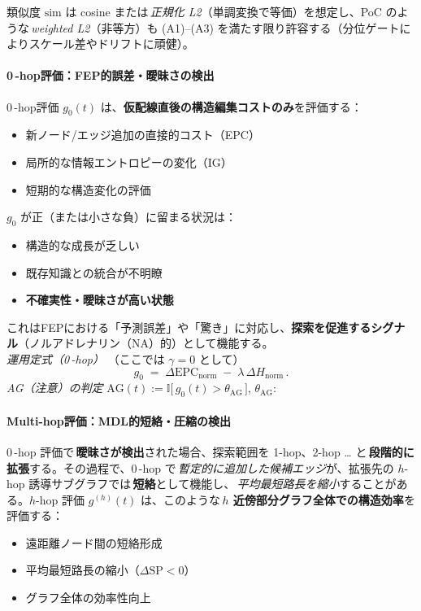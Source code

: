 \documentclass[ja=standard,xelatex]{bxjsarticle}
\begin{document}
\noindent 類似度 $\mathrm{sim}$ は cosine または\,\emph{正規化 L2}（単調変換で等価）を想定し、PoC のような\,\emph{weighted L2}（非等方）も (A1)–(A3) を満たす限り許容する（分位ゲートによりスケール差やドリフトに頑健）。


\paragraph{0\,\mbox{-}hop評価：FEP的誤差・曖昧さの検出}
0\,\mbox{-}hop評価 $g_0(t)$ は、\textbf{仮配線直後の構造編集コストのみ}を評価する：
\begin{itemize}
  \item 新ノード/エッジ追加の直接的コスト（EPC）
  \item 局所的な情報エントロピーの変化（IG）
  \item 短期的な構造変化の評価
\end{itemize}

$g_0$ が正（または小さな負）に留まる状況は：
\begin{itemize}
  \item 構造的な成長が乏しい
  \item 既存知識との統合が不明瞭
  \item \textbf{不確実性・曖昧さが高い状態}
\end{itemize}

これはFEPにおける「予測誤差」や「驚き」に対応し、\textbf{探索を促進するシグナル}（ノルアドレナリン（NA）的）として機能する。
\\[0.2em]
\textit{運用定式（0\,\mbox{-}hop）}\; （ここでは $\gamma{=}0$ として）
\begin{equation}
  g_0\;=\;\Delta\mathrm{EPC}_{\mathrm{norm}}\; -\; \lambda\,\Delta H_{\mathrm{norm}}\,.
  \label{eq:g0_runtime_b}
\end{equation}
\noindent \textit{AG（注意）の判定}\; \quad $\mathrm{AG}(t) := \mathbb{I}\big[\, g_0(t) > \theta_{\mathrm{AG}}\,\big]$, \;\; $\theta_{\mathrm{AG}}$:\,

\paragraph{Multi-hop評価：MDL的短絡・圧縮の検出}
0\,\mbox{-}hop 評価で\,\textbf{曖昧さが検出}された場合、探索範囲を 1-hop、2-hop … と\,\textbf{段階的に拡張}する。その過程で、0\,\mbox{-}hop で\,\emph{暫定的に追加した候補エッジ}が、拡張先の $h$-hop 誘導サブグラフでは\,\textbf{短絡}として機能し、\,\emph{平均最短路長を縮小}することがある。$h$-hop 評価 $g^{(h)}(t)$ は、このような\,\textbf{$h$ 近傍部分グラフ全体での構造効率}を評価する：
\begin{itemize}
  \item 遠距離ノード間の短絡形成
  \item 平均最短路長の縮小（$\Delta \text{SP} < 0$）
  \item グラフ全体の効率性向上
\end{itemize}
\end{document}
